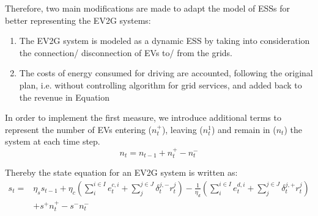 Therefore, two main modifications are made to adapt the model of ESSs for better representing the EV2G systems: 

\begin{enumerate}
	\item The EV2G system is modeled as a dynamic ESS by taking into consideration the connection/ disconnection of EVs to/ from the grids.
	\item The costs of energy consumed for driving are accounted, following the original plan, i.e. without controlling algorithm for grid services, and added back to the revenue in Equation
\end{enumerate}

In order to implement the first measure, we introduce additional terms to represent the number of EVs entering ($n_t^+$), leaving ($n_t^1$) and remain in ($n_t$) the system at each time step. 
\begin{equation}
n_t = n_{t-1} + n_t^+ - n_t^-
\end{equation}

Thereby the state equation for an EV2G system is written as:
\begin{equation}
\label{eq:tech-EV}
\begin{aligned}
s_t = & \eta_s s_{t-1} + \eta_c (\sum_{i}^{i \in I} e_t^{c,i} + \sum_{j}^{j \in J}\delta_t^{j,-}r_t^j)- \frac{1}{\eta_d} (\sum_{i}^{i \in I} e_t^{d,i} + \sum_{j}^{j \in J}\delta_t^{j,+}r_t^j) \\
&+ s^+ n_t^+ - s^- n_t^-
\end{aligned}
\end{equation} 



